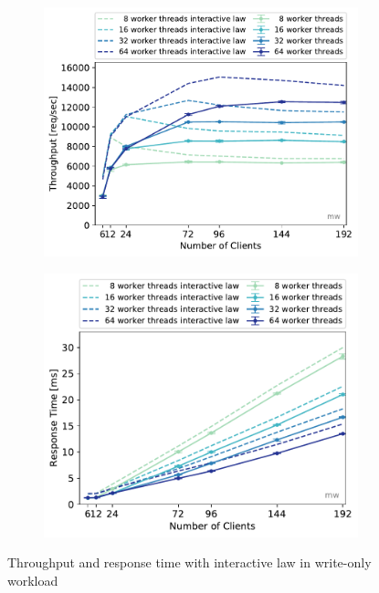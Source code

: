 \documentclass[11pt,a4paper]{article}
\begin{document}
\begin{figure}
	\begin{subfigure}[b]{.49\linewidth}
		\centering
		\includegraphics[width=\linewidth]{data/exp31_wo_tp_nc_w.pdf}
	\end{subfigure}\hfill
	\begin{subfigure}[b]{.49\linewidth}
		\centering
		\includegraphics[width=\linewidth]{data/exp31_wo_rt_nc_w.pdf}
	\end{subfigure}%
	\caption{Throughput and response time with interactive law in write-only workload}
\end{figure}
\end{document}
